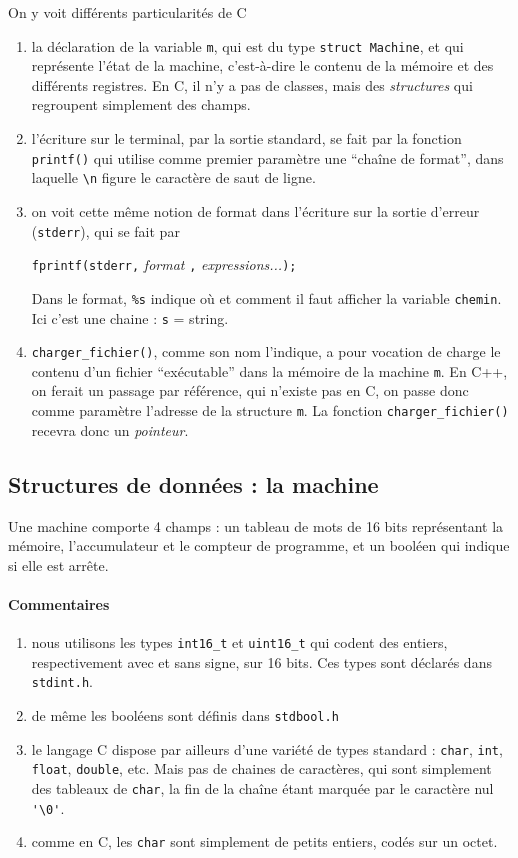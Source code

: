 \documentclass[10pt]{article}
\begin{document}
On y voit différents particularités de C
\begin{enumerate}
\item la déclaration de la variable \texttt{m}, qui est du type
  \texttt{struct Machine}, et qui représente l'état de la machine,
  c'est-à-dire le contenu de la mémoire et des différents
  registres. En C, il n'y a pas de classes, mais des \emph{structures} qui
  regroupent simplement des champs.
\item l'écriture sur le terminal, par la sortie standard, se fait par la fonction \texttt{printf()}
qui utilise comme premier paramètre une ``chaîne de format'', dans laquelle 
\verb+\n+ figure le caractère de saut de ligne.
\item on voit cette même notion de format dans l'écriture sur la sortie
d'erreur (\texttt{stderr}), qui se fait par
\begin{center}
\texttt{fprintf(stderr,} \emph{format} \texttt{,} \emph{expressions...}\texttt{);}
\end{center}
Dans le format,  \verb/%s/ indique où et comment il faut afficher la variable \texttt{chemin}. 
Ici c'est une chaine :  \texttt{s} = string.
\item \texttt{charger\_fichier()}, comme son nom l'indique, a pour
  vocation de charge le contenu d'un fichier ``exécutable'' dans la
  mémoire de la machine \texttt{m}. En C++, on ferait un passage par
  référence, qui n'existe pas en C, on passe donc comme paramètre
  l'adresse de la structure \texttt{m}. La fonction
  \texttt{charger\_fichier()} recevra donc un \emph{pointeur}.

\end{enumerate}

\subsection{Structures de données : la machine}

Une machine comporte 4 champs : un tableau de mots de 16 bits 
représentant la mémoire, l'accumulateur et le compteur de programme, 
et un booléen qui indique si elle est arrête.

\paragraph{Commentaires}
\begin{enumerate}
\item nous utilisons les types \texttt{int16\_t} et \texttt{uint16\_t}
  qui codent des entiers, respectivement avec et sans signe, sur 16
  bits. Ces types sont déclarés dans \texttt{stdint.h}.
\item de même les booléens sont définis dans \texttt{stdbool.h}
\item le langage C dispose par ailleurs d'une variété de types
  standard : \texttt{char}, \texttt{int}, \texttt{float},
  \texttt{double}, etc.  Mais pas de chaines de caractères, qui sont
  simplement des tableaux de \texttt{char}, la fin de la chaîne étant
  marquée par le caractère nul \verb/'\0'/.
\item comme en C, les \texttt{char} sont simplement de petits entiers, codés
sur un octet.
\end{enumerate}
\end{document}
